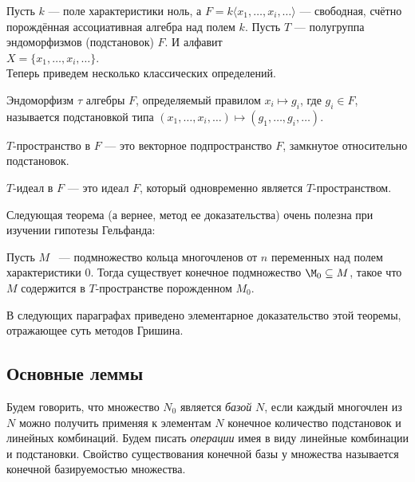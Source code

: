 Пусть $k$ — поле характеристики ноль, а $F = k\langle x_1, \ldots, x_i, \ldots \rangle$ — свободная, счётно порождённая ассоциативная алгебра над полем $k$.
Пусть $T$ — полугруппа эндоморфизмов (подстановок) $F$.
И алфавит\\ $X = \{ x_1, \ldots, x_i, \ldots \}$.\\
Теперь приведем несколько классических определений.

\vskip 0.1in\noindent
\begin{definition}
    Эндоморфизм $\tau$ алгебры $F$, определяемый правилом $x_i \mapsto g_i$, где $g_i \in F$, называется подстановкой типа $(x_1, \ldots, x_i, \ldots) \mapsto (g_1, \ldots, g_i, \ldots)$.
\end{definition}
\vskip 0.1in\noindent

\vskip 0.1in\noindent
\begin{definition}
    $T$-пространство в $F$ — это векторное подпространство $F$, замкнутое относительно подстановок.
\end{definition}
\vskip 0.1in\noindent

\vskip 0.1in\noindent
\begin{definition}
    $T$-идеал в $F$ — это идеал $F$, который одновременно является $T$-пространством.
\end{definition}
\vskip 0.1in\noindent

Следующая теорема (а вернее, метод ее доказательства) очень полезна при изучении гипотезы Гельфанда:
\vskip 0.1in\noindent
\begin{theorem}
    \label{main}
    Пусть $M$ ~--- подмножество кольца многочленов от $n$ переменных над полем характеристики 0.
    Тогда существует конечное подмножество $\M_0\subseteq M$, такое что $M$ содержится в $T$-пространстве порожденном $M_0$.
\end{theorem}
\vskip 0.1in\noindent
В следующих параграфах приведено элементарное доказательство этой теоремы, отражающее суть методов Гришина.

\subsection{Основные леммы}\label{subsec:grishin-main-lemmas}

Будем говорить, что множество $N_0$ является \textit{базой} $N$, если каждый многочлен из $N$ можно получить применяя к элементам $N$ конечное количество подстановок и линейных комбинаций.
Будем писать \textit{операции} имея в виду линейные комбинации и подстановки.
Свойство существования конечной базы у множества называется конечной базируемостью множества.

